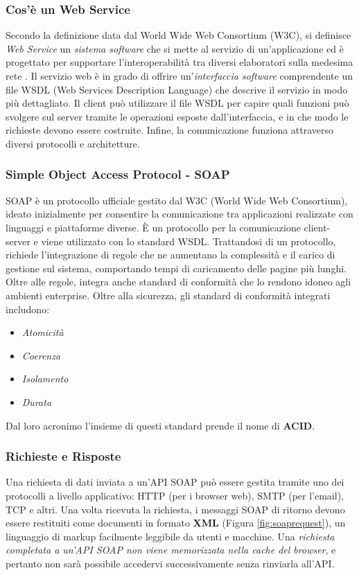 \subsubsection{Cos'è un Web Service}
Secondo la definizione data dal World Wide Web Consortium (W3C), si definisce \emph{Web Service} un \emph{sistema software} che si mette al servizio di un'applicazione ed è progettato per supportare l'interoperabilità tra diversi elaboratori sulla medesima rete \cite{w3c:webservices}. Il servizio web è in grado di offrire un’\textit{interfaccia software} comprendente un file WSDL (Web Services Description Language) che descrive il servizio in modo più dettagliato. Il client può utilizzare il file WSDL per capire quali funzioni può svolgere sul server tramite le operazioni esposte dall'interfaccia, e in che modo le richieste devono essere costruite. Infine, la comunicazione funziona attraverso diversi protocolli e architetture. 

\subsubsection{Simple Object Access Protocol - SOAP}
SOAP è un protocollo ufficiale gestito dal W3C (World Wide Web Consortium), ideato inizialmente per consentire la comunicazione tra applicazioni realizzate con linguaggi e piattaforme diverse. È un protocollo per la comunicazione client-server e viene utilizzato con lo standard WSDL. Trattandosi di un protocollo, richiede l'integrazione di regole che ne aumentano la complessità e il carico di gestione sul sistema, comportando tempi di caricamento delle pagine più lunghi. Oltre alle regole, integra anche standard di conformità che lo rendono idoneo agli ambienti enterprise. Oltre alla sicurezza, gli standard di conformità integrati includono: 
\begin{itemize}
    \item \emph{Atomicità}
    \item \emph{Coerenza}
    \item \emph{Isolamento}
    \item \emph{Durata}
\end{itemize}
Dal loro acronimo l'insieme di questi standard prende il nome di \textbf{ACID}.

\subsubsection{Richieste e Risposte}
Una richiesta di dati inviata a un'API SOAP può essere gestita tramite uno dei protocolli a livello applicativo: HTTP (per i browser web), SMTP (per l'email), TCP e altri. Una volta ricevuta la richiesta, i messaggi SOAP di ritorno devono essere restituiti come documenti in formato \textbf{XML} (Figura \ref{fig:soaprequest}), un linguaggio di markup facilmente leggibile da utenti e macchine. Una \textit{richiesta completata a un'API SOAP non viene memorizzata nella cache del browser}, e pertanto non sarà possibile accedervi successivamente senza rinviarla all'API.

